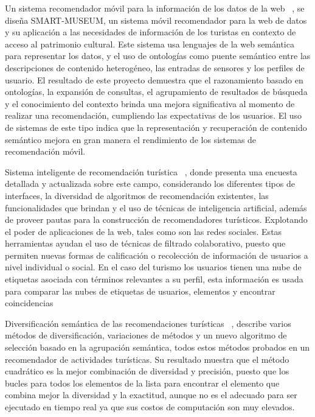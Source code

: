 \documentclass[lnbip,sechang,a4paper]{svmultln}
\begin{document}
Un sistema recomendador móvil  para la información de los datos de la web ~\cite{diez}, se diseña SMART-MUSEUM, un sistema móvil recomendador para la web de datos y su aplicación a las necesidades de información de los turistas en contexto de acceso al patrimonio cultural. Este sistema usa lenguajes de la web semántica para representar los datos, y el uso de ontologías como puente semántico entre las descripciones de contenido heterogéneo, las entradas de sensores y los perfiles de usuario. El resultado de este proyecto demuestra que el razonamiento basado en ontologías, la expansión de consultas, el agrupamiento de resultados de búsqueda y el conocimiento del contexto brinda una mejora significativa al momento de realizar una recomendación, cumpliendo las expectativas de los usuarios. El uso de sistemas de este tipo indica que la representación y recuperación de contenido semántico mejora en gran manera el rendimiento de los sistemas de recomendación móvil.

Sistema inteligente de recomendación turística ~\cite{once}, donde presenta una encuesta detallada y actualizada sobre este campo, considerando los diferentes tipos de interfaces, la diversidad de algoritmos de recomendación existentes, las funcionalidades que brindan y el uso de técnicas de inteligencia artificial, además de proveer pautas para la construcción de recomendadores turísticos. Explotando el poder de aplicaciones de la web, tales como son las redes  sociales. Estas herramientas ayudan el uso de técnicas de filtrado colaborativo, puesto que permiten nuevas formas de calificación o recolección de información de usuarios a nivel individual o social. En el caso del turismo los usuarios tienen una nube de etiquetas asociada con términos relevantes a su perfil, esta información es usada para comparar las nubes de etiquetas de usuarios, elementos y encontrar coincidencias

Diversificación semántica de las recomendaciones turísticas ~\cite{docea}, describe varios métodos de diversificación, variaciones de métodos y un nuevo algoritmo de selección basado en la agrupación semántica, todos estos métodos probados en un recomendador de actividades turísticas. Su resultado muestra que el método cuadrático es la mejor combinación de diversidad y precisión, puesto que los bucles para todos los elementos de la lista para encontrar el elemento que combina mejor la diversidad y la exactitud, aunque no es el adecuado para ser ejecutado en tiempo real ya que sus costos de computación son muy elevados.
\end{document}
